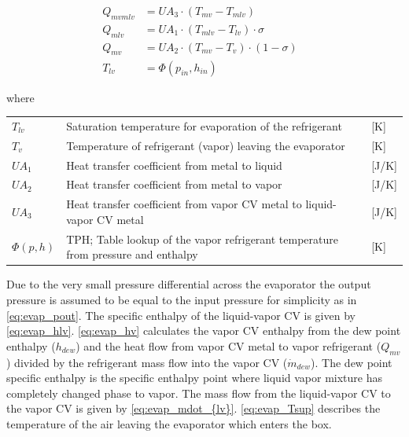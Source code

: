 \begin{align}
	Q_{mvmlv} & = U A_3 \cdot (T_{mv} - T_{mlv}) \label{eq:Q_mvml}             &  \\
	Q_{mlv}   & = U A_1 \cdot (T_{mlv} - T_{lv}) \cdot \sigma	\label{eq:Q_ml}&  \\
	Q_{mv}    & = U A_2 \cdot (T_{mv} - T_v) \cdot (1- \sigma) \label{eq:Q_mv} &  \\
	T_{lv}    & = \Phi(p_{in}, h_{in}) \label{eq:T_v}                          &
\end{align}

where

\begin{center}
	\begin{tabular}{l p{10cm} l}
		$T_{lv}$    & Saturation temperature for evaporation of the refrigerant                         & [\si{K}]        \\
		$T_{v}$     & Temperature of refrigerant (vapor) leaving the evaporator                         & [\si{K}]        \\
		$UA_1$      & Heat transfer coefficient from metal to liquid                                    & [\si{J}/\si{K}] \\
		$UA_2$      & Heat transfer coefficient from metal to vapor                                     & [\si{J}/\si{K}] \\
		$UA_3$      & Heat transfer coefficient from vapor CV metal to liquid-vapor CV metal            & [\si{J}/\si{K}] \\
		$\Phi(p,h)$ 		& TPH; Table lookup of the vapor refrigerant temperature from pressure and enthalpy & [\si{K}]
	\end{tabular}
\end{center}

\medskip
Due to the very small pressure differential across the evaporator the output pressure is assumed to be equal to the input pressure for simplicity as in \cref{eq:evap_pout}. The specific enthalpy of the liquid-vapor CV is given by \cref{eq:evap_hlv}. \cref{eq:evap_hv} calculates the vapor CV enthalpy from the dew point enthalpy ($h_{dew}$) and the heat flow from vapor CV metal to vapor refrigerant ($Q_{mv}$) divided by the refrigerant mass flow into the vapor CV ($\dot{m}_{dew}$). The dew point specific enthalpy is the specific enthalpy point where liquid vapor mixture has completely changed phase to vapor. The mass flow from the liquid-vapor CV to the vapor CV is given by \cref{eq:evap_mdot_{lv}}. \cref{eq:evap_Tsup} describes the temperature of the air leaving the evaporator which enters the box.

